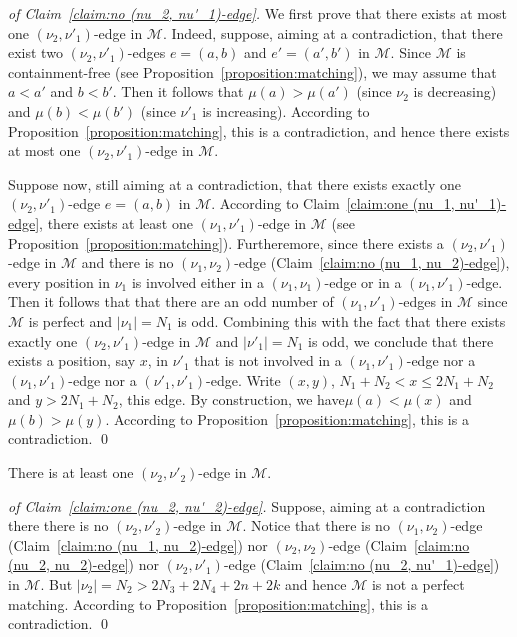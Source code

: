 \documentclass[a4paper,10pt]{llncs}
\begin{document}
\begin{proof}[of Claim~\ref{claim:no (nu_2, nu'_1)-edge}]
  We first prove that there exists at most one
  $(\nu_2, \nu'_1)$-edge in $\mathcal{M}$.
  Indeed, suppose, aiming at a contradiction, that there exist
  two $(\nu_2, \nu'_1)$-edges $e = (a, b)$ and $e' = (a', b')$ in $\mathcal{M}$.
  Since $\mathcal{M}$ is containment-free (see Proposition~\ref{proposition:matching}),
  we may assume that $a < a'$ and $b < b'$.
  Then it follows that $\mu(a) > \mu(a')$
  (since $\nu_2$ is decreasing) and $\mu(b) < \mu(b')$
  (since $\nu'_1$ is increasing).
  According to Proposition~\ref{proposition:matching}, this is
  a contradiction, and hence
  there exists at most one
  $(\nu_2, \nu'_1)$-edge in $\mathcal{M}$.

  Suppose now, still aiming at a contradiction, that there exists
  exactly one $(\nu_2, \nu'_1)$-edge $e = (a, b)$ in $\mathcal{M}$.
  According to Claim~\ref{claim:one (nu_1, nu'_1)-edge}, there exists at least
  one $(\nu_1, \nu'_1)$-edge in $\mathcal{M}$
  (see Proposition~\ref{proposition:matching}).
  Furtheremore, since there exists a $(\nu_2, \nu'_1)$-edge in $\mathcal{M}$
  and
  there is no $(\nu_1, \nu_2)$-edge (Claim~\ref{claim:no (nu_1, nu_2)-edge}),
  every position in $\nu_1$ is involved either in a
  $(\nu_1, \nu_1)$-edge or in a $(\nu_1, \nu'_1)$-edge.
  Then it follows that that there are an odd number of $(\nu_1, \nu'_1)$-edges
  in $\mathcal{M}$ since $\mathcal{M}$ is perfect and $|\nu_1| = N_1$ is odd.
  Combining this with the fact that there exists exactly one $(\nu_2, \nu'_1)$-edge
  in $\mathcal{M}$ and $|\nu'_1| = N_1$ is odd,
  we conclude that there exists a position, say $x$, in $\nu'_1$
  that is not involved in a $(\nu_1, \nu'_1)$-edge nor a $(\nu_1, \nu'_1)$-edge
  nor a $(\nu'_1, \nu'_1)$-edge.
  Write $(x, y)$, $N_1+N_2 < x \leq 2N_1 + N_2$ and $y > 2N_1 + N_2$, this edge.
  By construction,
  we have$\mu(a) < \mu(x)$ and $\mu(b) > \mu(y)$.
  According to Proposition~\ref{proposition:matching}, this is
  a contradiction.
  \qed
\end{proof}

\begin{claim}
  \label{claim:one (nu_2, nu'_2)-edge}
  There is at least one $(\nu_2, \nu'_2)$-edge in $\mathcal{M}$.
\end{claim}

\begin{proof}[of Claim~\ref{claim:one (nu_2, nu'_2)-edge}]
  Suppose, aiming at a contradiction there there is no
  $(\nu_2, \nu'_2)$-edge in $\mathcal{M}$.
  Notice that there is no
  $(\nu_1, \nu_2)$-edge (Claim~\ref{claim:no (nu_1, nu_2)-edge})
  nor $(\nu_2, \nu_2)$-edge (Claim~\ref{claim:no (nu_2, nu_2)-edge})
  nor $(\nu_2, \nu'_1)$-edge (Claim~\ref{claim:no (nu_2, nu'_1)-edge})
  in $\mathcal{M}$.
  But $|\nu_2| = N_2 > 2N_3 + 2N_4 + 2n + 2k$ and hence $\mathcal{M}$ is not
  a perfect matching.
  According to Proposition~\ref{proposition:matching}, this is
  a contradiction.
  \qed
\end{proof}
\end{document}
